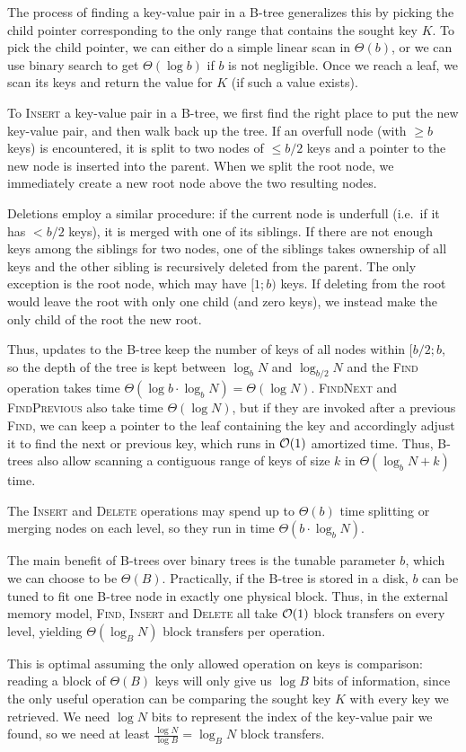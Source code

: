 The process of finding a key-value pair in a B-tree generalizes this
by picking the child pointer corresponding to the only range that contains
the sought key $K$. To pick the child pointer, we can either do a simple
linear scan in $\Theta(b)$, or we can use binary search to get
$\Theta(\log b)$ if $b$ is not negligible.
Once we reach a leaf, we scan its keys and return the value for $K$
(if such a value exists).

To \textsc{Insert} a key-value pair in a B-tree, we first find the right
place to put the new key-value pair, and then walk back up the tree.
If an overfull node (with $\geq b$ keys) is encountered, it is split
to two nodes of $\leq b/2$ keys and a pointer to the new node is inserted into
the parent. When we split the root node, we immediately create a new
root node above the two resulting nodes.

Deletions employ a similar procedure: if the current node is underfull
(i.e.\ if it has $< b/2$ keys), it is merged with one of its siblings.
If there are not enough keys among the siblings for two nodes,
one of the siblings takes ownership of all keys and the other sibling
is recursively deleted from the parent.
The only exception is the root node, which may have $[1;b)$ keys.
If deleting from the root would leave the root with only one child
(and zero keys), we instead make the only child of the root the new root.

Thus, updates to the B-tree keep the number of keys of all nodes within
$[b/2;b$, so the depth of the tree is kept between $\log_b N$ and
$\log_{b/2} N$ and the \textsc{Find} operation takes time
$\Theta(\log b \cdot \log_b N)=\Theta(\log N)$. \textsc{FindNext} and
\textsc{FindPrevious} also take time $\Theta(\log N)$, but if they are invoked
after a previous \textsc{Find}, we can keep a pointer to the leaf containing
the key and accordingly adjust it to find the next or previous key, which runs
in $\mathcal{O}(1)$ amortized time. Thus, B-trees also allow scanning a contiguous
range of keys of size $k$ in $\Theta(\log_b N + k)$ time.

The \textsc{Insert} and \textsc{Delete} operations may spend up to
$\Theta(b)$ time splitting or merging nodes on each level, so they run in
time $\Theta(b \cdot \log_b N)$.

The main benefit of B-trees over binary trees is the tunable parameter
$b$, which we can choose to be $\Theta(B)$. Practically, if the B-tree
is stored in a disk, $b$ can be tuned to fit one B-tree node in exactly one
physical block. Thus, in the external memory model, \textsc{Find},
\textsc{Insert} and \textsc{Delete} all take $\mathcal{O}(1)$ block transfers
on every level, yielding $\Theta(\log_B N)$ block transfers per operation.

This is optimal assuming the only allowed operation
on keys is comparison: reading a block of $\Theta(B)$ keys will only
give us $\log B$ bits of information, since the only useful operation
can be comparing the sought key $K$ with every key we retrieved.
We need $\log N$ bits to represent the index of the key-value pair we found,
so we need at least $\frac{\log N}{\log B}=\log_B N$ block transfers.
